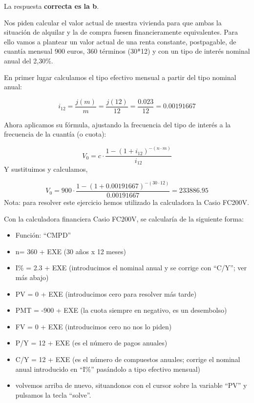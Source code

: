 \documentclass[
  letterpaper,
  DIV=11,
  numbers=noendperiod]{scrreprt}
\begin{document}
\begin{tcolorbox}[enhanced jigsaw, left=2mm, opacityback=0, colback=white, breakable, arc=.35mm, bottomrule=.15mm, rightrule=.15mm, toprule=.15mm, leftrule=.75mm, colframe=quarto-callout-tip-color-frame]
\begin{minipage}[t]{5.5mm}
\textcolor{quarto-callout-tip-color}{\faLightbulb}
\end{minipage}%
\begin{minipage}[t]{\textwidth - 5.5mm}

La respuesta \textbf{correcta es la b}.

Nos piden calcular el valor actual de nuestra vivienda para que ambas la
situación de alquilar y la de compra fuesen financieramente
equivalentes. Para ello vamos a plantear un valor actual de una renta
constante, postpagable, de cuantía mensual 900 euros, 360 términos
(30*12) y con un tipo de interés nominal anual del 2,30\%.

En primer lugar calculamos el tipo efectivo mensual a partir del tipo
nominal anual:

\[i_{12}=\frac{j\left(m\right)}{m}=\frac{j\left(12\right)}{12}=\frac{0.023}{12}=0.00191667\]

Ahora aplicamos su fórmula, ajustando la frecuencia del tipo de interés
a la frecuencia de la cuantía (o cuota):

\[V_0=c\cdot\frac{1-\left(1+i_{12}\right)^{-(n \cdot m)}}{i_{12}}\] Y
sustituimos y calculamos,

\[V_0=900\cdot\frac{1-\left(1+0.00191667\right)^{-(30\cdot 12)}}{0.00191667}=233886.95\]
Nota: para resolver este ejercicio hemos utilizado la calculadora la
Casio FC200V.

Con la calculadora financiera Casio FC200V, se calcularía de la
siguiente forma:

\begin{itemize}
\item
  Función: ``CMPD''
\item
  n= 360 + EXE (30 años x 12 meses)
\item
  I\% = 2.3 + EXE (introducimos el nominal anual y se corrige con
  ``C/Y''; ver más abajo)
\item
  PV = 0 + EXE (introducimos cero para resolver más tarde)
\item
  PMT = -900 + EXE (la cuota siempre en negativo, es un desembolso)
\item
  FV = 0 + EXE (introducimos cero no nos lo piden)
\item
  P/Y = 12 + EXE (es el número de pagos anuales)
\item
  C/Y = 12 + EXE (es el número de compuestos anuales; corrige el nominal
  anual introducido en ``I\%'' pasándolo a tipo efectivo mensual)
\item
  volvemos arriba de nuevo, situandonos con el cursor sobre la variable
  ``PV'' y pulsamos la tecla ``solve''.
\end{itemize}


\end{minipage}
\end{tcolorbox}
\end{document}
